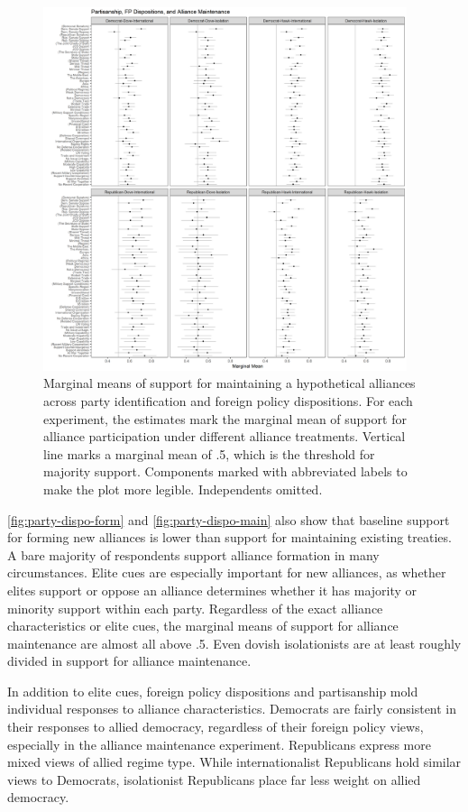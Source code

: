 \documentclass[12pt]{article}
\begin{document}
\begin{figure}
	\centering
		\includegraphics[width=0.95\textwidth]{../figures/party-dispo-main.png}
	\caption{Marginal means of support for maintaining a hypothetical alliances across party identification and foreign policy dispositions. For each experiment, the estimates mark the marginal mean of support for alliance participation under different alliance treatments. Vertical line marks a marginal mean of .5, which is the threshold for majority support. Components marked with abbreviated labels to make the plot more legible. Independents omitted.}
	\label{fig:party-dispo-main}
\end{figure}


\autoref{fig:party-dispo-form} and \autoref{fig:party-dispo-main} also show that baseline support for forming new alliances is lower than support for maintaining existing treaties. 
A bare majority of respondents support alliance formation in many circumstances. 
Elite cues are especially important for new alliances, as whether elites support or oppose an alliance determines whether it has majority or minority support within each party. 
Regardless of the exact alliance characteristics or elite cues, the marginal means of support for alliance maintenance are almost all above .5. 
Even dovish isolationists are at least roughly divided in support for alliance maintenance.


In addition to elite cues, foreign policy dispositions and partisanship mold individual responses to alliance characteristics. 
Democrats are fairly consistent in their responses to allied democracy, regardless of their foreign policy views, especially in the alliance maintenance experiment. 
Republicans express more mixed views of allied regime type. 
While internationalist Republicans hold similar views to Democrats, isolationist Republicans place far less weight on allied democracy. 
\end{document}
